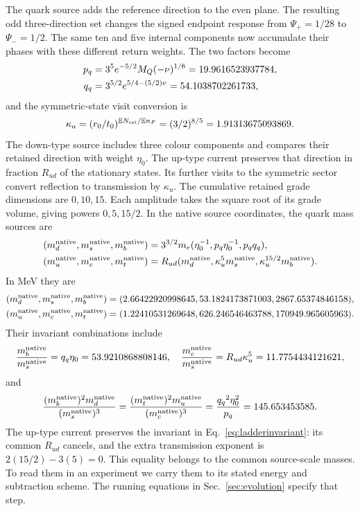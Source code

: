 \documentclass[aps,prx,onecolumn,10pt,notitlepage,nofootinbib,longbibliography]{revtex4-2}
\numberwithin{equation}{section}
\numberwithin{table}{section}
\newcommand{\EE}{\mathbb E}
\begin{document}
The quark source adds the reference direction to the even plane. The resulting odd three-direction set changes the signed endpoint response from $\Psi_+=1/28$ to $\Psi_-=1/2$. The same ten and five internal components now accumulate their phases with these different return weights. The two factors become
\begin{align}
 {p_q}&=3^5e^{-5/2}M_Q(-\nu)^{1/6}=19.9616523937784,\notag\\
 {q_q}&=3^{5/2}e^{5/4-(5/2)\nu}=54.1038702261733,
\end{align}
and the symmetric-state visit conversion is
\begin{equation}
 \kappa_u=(r_0/t_0)^{\EE N_{\rm ret}/\EE n_F}=(3/2)^{8/5}=1.91313675093869.
\end{equation}
The down-type source includes three colour components and compares their retained direction with weight $\eta_0$. The up-type current preserves that direction in fraction $R_{ud}$ of the stationary states. Its further visits to the symmetric sector convert reflection to transmission by $\kappa_u$. The cumulative retained grade dimensions are $0,10,15$. Each amplitude takes the square root of its grade volume, giving powers $0,5,15/2$. In the native source coordinates, the quark mass sources are
\begin{align}
 (m_d^{\rm native},m_s^{\rm native},m_b^{\rm native})&=3^{3/2}m_e(\eta_0^{-1},{p_q}\eta_0^{-1},{p_q}{q_q}),\notag\\
 (m_u^{\rm native},m_c^{\rm native},m_t^{\rm native})&=R_{ud}(m_d^{\rm native},\kappa_u^5m_s^{\rm native},\kappa_u^{15/2}m_b^{\rm native}).
 \label{eq:quarks}
\end{align}
In MeV they are
\begin{align}
 (m_d^{\rm native},m_s^{\rm native},m_b^{\rm native})&=(2.66422920998645,53.1824173871003,2867.65374846158),\notag\\
 (m_u^{\rm native},m_c^{\rm native},m_t^{\rm native})&=(1.22410531269648,626.246546463788,170949.965605963).
\end{align}
Their invariant combinations include
\begin{equation}
 \frac{m_b^{\rm native}}{m_s^{\rm native}}={q_q}\eta_0=53.9210868808146,\quad
 \frac{m_c^{\rm native}}{m_s^{\rm native}}=R_{ud}\kappa_u^5=11.7754434121621,
\end{equation}
and
\begin{equation}
 \frac{(m_b^{\rm native})^2m_d^{\rm native}}{(m_s^{\rm native})^3}
 =\frac{(m_t^{\rm native})^2m_u^{\rm native}}{(m_c^{\rm native})^3}
 =\frac{{q_q}^2\eta_0^2}{{p_q}}=145.653453585.
 \label{eq:ladderinvariant}
\end{equation}
The up-type current preserves the invariant in Eq.~\eqref{eq:ladderinvariant}: its common $R_{ud}$ cancels, and the extra transmission exponent is $2(15/2)-3(5)=0$. This equality belongs to the common source-scale masses. To read them in an experiment we carry them to its stated energy and subtraction scheme. The running equations in Sec.~\ref{sec:evolution} specify that step.
\end{document}
